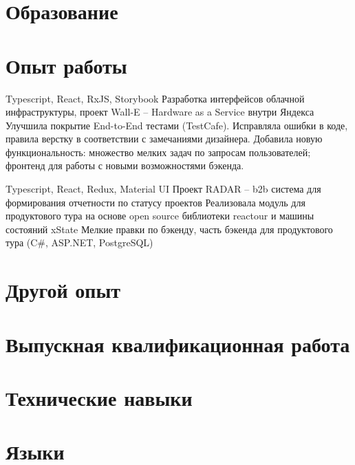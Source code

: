 \documentclass[11pt,a4paper,sans]{moderncv}
\begin{document}
\makecvtitle

\section{Образование}

\section{Опыт работы}
\cvitem {} {Typescript, React, RxJS, Storybook}
\cvitem {} {Разработка интерфейсов облачной инфраструктуры, проект Wall-E -- Hardware as a Service внутри Яндекса}
\cvitem {} {{Улучшила покрытие End-to-End тестами (TestCafe). Исправляла ошибки в коде, правила верстку в соответствии с замечаниями дизайнера. Добавила новую функциональность: множество мелких задач по запросам пользователей; фронтенд для работы с новыми возможностями бэкенда.}}

\cvitem {--} {Typescript, React, Redux, Material UI}
 {Проект RADAR -- b2b система для формирования отчетности по статусу проектов}
\cvitem {} {Реализовала модуль для продуктового тура на основе open source библиотеки reactour и машины состояний xState}
\cvitem {} {{Мелкие правки по бэкенду, часть бэкенда для продуктового тура (C\#, ASP.NET, PostgreSQL)}}

\section{Другой опыт}

\section{Выпускная квалификационная работа}

\section{Технические навыки}

\section{Языки}
\end{document}

